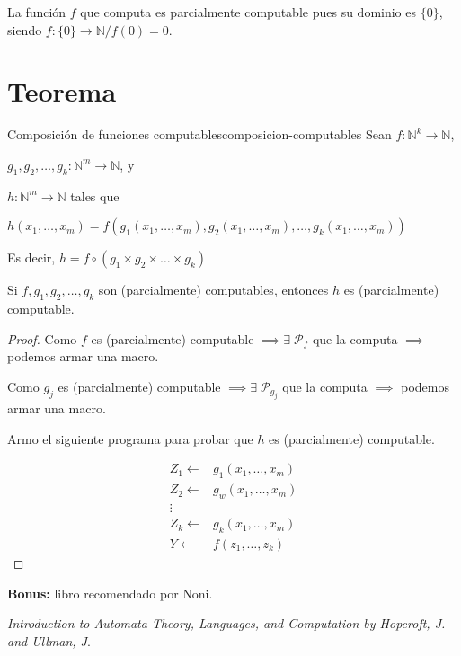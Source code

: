 La función $f$ que computa es parcialmente computable pues su dominio es 
$\{0\}$, siendo $f: \{ 0 \} \to \mathbb{N} / f(0) = 0$.

\bigskip


\section{Teorema}

\begin{teorema}{Composición de funciones computables}{composicion-computables}
    Sean $f: \mathbb{N}^k \to \mathbb{N}$,

    \phantom{Sean }$g_1, g_2, \dotsc, g_k: \mathbb{N}^m \to \mathbb{N}$, y

    \phantom{Sean }$h: \mathbb{N}^m \to \mathbb{N}$ tales que

    \smallskip

    $h(x_1, \dotsc, x_m) = f(g_1 (x_1, \dotsc, x_m), g_2 (x_1, \dotsc, x_m),
    \dotsc, g_k (x_1, \dotsc, x_m))$

    \smallskip

    Es decir, $h = f \circ (g_1 \times g_2 \times \dotsc \times g_k)$

    \medskip

    Si $f, g_1, g_2, \dotsc, g_k$ son (parcialmente) computables, entonces $h$ es
    (parcialmente) computable.
\end{teorema}

\begin{proof} \phantom{.}

    Como $f$ es (parcialmente) computable 
    $\implies \exists \; \mathcal{P}_f$ que
    la computa $\implies$ podemos armar una macro.

    Como $g_j$ es (parcialmente) computable 
    $\implies \exists \; \mathcal{P}_{g_j}$ 
    que la computa $\implies$ podemos armar una macro.

    Armo el siguiente programa para probar que $h$ es (parcialmente) 
    computable.

    \begin{align*}
        Z_1 \gets& g_1 (x_1, \dotsc, x_m) \\
        Z_2 \gets& g_w (x_1, \dotsc, x_m) \\
        \vdots & \\
        Z_k \gets& g_k (x_1, \dotsc, x_m) \\
        Y \gets& f(z_1, \dotsc, z_k)
    \end{align*}
\end{proof}



\textbf{Bonus:} libro recomendado por Noni.

\textit{Introduction to Automata Theory, Languages, and Computation by 
Hopcroft, J. and Ullman, J}.

